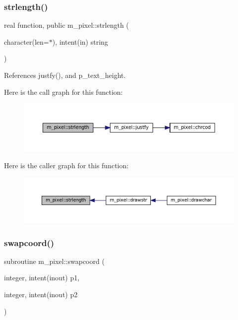 \mbox{\label{namespacem__pixel_a0468f8d9308bade7f8f2a68a133271d2}} 
\subsubsection{\texorpdfstring{strlength()}{strlength()}}
{\footnotesize\ttfamily real function, public m\+\_\+pixel\+::strlength (\begin{DoxyParamCaption}\item[{character(len=$\ast$), intent(in)}]{string }\end{DoxyParamCaption})}



References justfy(), and p\+\_\+text\+\_\+height.

Here is the call graph for this function\+:
\nopagebreak
\begin{figure}[H]
\begin{center}
\leavevmode
\includegraphics[width=350pt]{namespacem__pixel_a0468f8d9308bade7f8f2a68a133271d2_cgraph}
\end{center}
\end{figure}
Here is the caller graph for this function\+:
\nopagebreak
\begin{figure}[H]
\begin{center}
\leavevmode
\includegraphics[width=350pt]{namespacem__pixel_a0468f8d9308bade7f8f2a68a133271d2_icgraph}
\end{center}
\end{figure}
\mbox{\label{namespacem__pixel_a063f74c3dd2f7f086dc47ec68abc22c9}} 
\subsubsection{\texorpdfstring{swapcoord()}{swapcoord()}}
{\footnotesize\ttfamily subroutine m\+\_\+pixel\+::swapcoord (\begin{DoxyParamCaption}\item[{integer, intent(inout)}]{p1,  }\item[{integer, intent(inout)}]{p2 }\end{DoxyParamCaption})\hspace{0.3cm}{\ttfamily [private]}}


